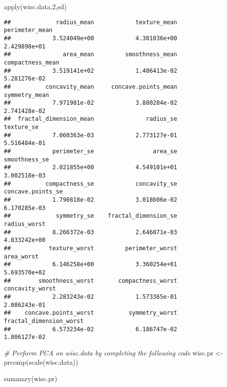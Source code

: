 \documentclass[
]{article}
\newenvironment{Shaded}{\begin{snugshade}}{\end{snugshade}}
\newcommand{\CommentTok}[1]{\textcolor[rgb]{0.56,0.35,0.01}{\textit{#1}}}
\newcommand{\DecValTok}[1]{\textcolor[rgb]{0.00,0.00,0.81}{#1}}
\newcommand{\FunctionTok}[1]{\textcolor[rgb]{0.00,0.00,0.00}{#1}}
\newcommand{\NormalTok}[1]{#1}
\newcommand{\OtherTok}[1]{\textcolor[rgb]{0.56,0.35,0.01}{#1}}
\begin{document}
\begin{Shaded}
\begin{Highlighting}[]
\FunctionTok{apply}\NormalTok{(wisc.data,}\DecValTok{2}\NormalTok{,sd)}
\end{Highlighting}
\end{Shaded}

\begin{verbatim}
##             radius_mean            texture_mean          perimeter_mean 
##            3.524049e+00            4.301036e+00            2.429898e+01 
##               area_mean         smoothness_mean        compactness_mean 
##            3.519141e+02            1.406413e-02            5.281276e-02 
##          concavity_mean     concave.points_mean           symmetry_mean 
##            7.971981e-02            3.880284e-02            2.741428e-02 
##  fractal_dimension_mean               radius_se              texture_se 
##            7.060363e-03            2.773127e-01            5.516484e-01 
##            perimeter_se                 area_se           smoothness_se 
##            2.021855e+00            4.549101e+01            3.002518e-03 
##          compactness_se            concavity_se       concave.points_se 
##            1.790818e-02            3.018606e-02            6.170285e-03 
##             symmetry_se    fractal_dimension_se            radius_worst 
##            8.266372e-03            2.646071e-03            4.833242e+00 
##           texture_worst         perimeter_worst              area_worst 
##            6.146258e+00            3.360254e+01            5.693570e+02 
##        smoothness_worst       compactness_worst         concavity_worst 
##            2.283243e-02            1.573365e-01            2.086243e-01 
##    concave.points_worst          symmetry_worst fractal_dimension_worst 
##            6.573234e-02            6.186747e-02            1.806127e-02
\end{verbatim}

\begin{Shaded}
\begin{Highlighting}[]
\CommentTok{\# Perform PCA on wisc.data by completing the following code}
\NormalTok{wisc.pr }\OtherTok{\textless{}{-}} \FunctionTok{prcomp}\NormalTok{(}\FunctionTok{scale}\NormalTok{(wisc.data))}
\end{Highlighting}
\end{Shaded}

\begin{Shaded}
\begin{Highlighting}[]
\FunctionTok{summary}\NormalTok{(wisc.pr)}
\end{Highlighting}
\end{Shaded}
\end{document}
